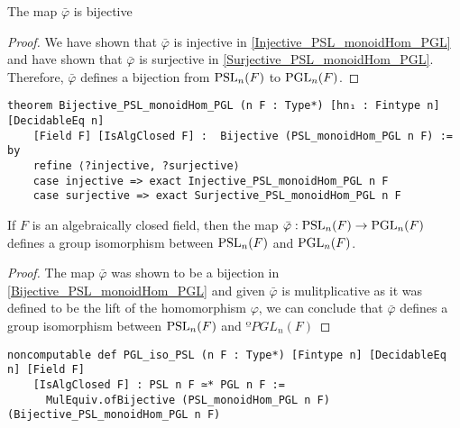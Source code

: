 \begin{lemma}
\label{Bijective_PSL_monoidHom_PGL}
\leanok
    The map $\bar{\varphi}$ is bijective
\end{lemma}
\begin{proof}
\leanok
 We have shown that $\bar{\varphi}$ is injective in \ref{Injective_PSL_monoidHom_PGL} and have shown that $\bar{\varphi}$ is surjective in \ref{Surjective_PSL_monoidHom_PGL}. 
 Therefore, $\bar{\varphi}$ defines a bijection from $\operatorname{PSL}_n(F)$ to $\operatorname{PGL}_n(F)$.
\end{proof}
\begin{footnotesize}
\begin{verbatim}
theorem Bijective_PSL_monoidHom_PGL (n F : Type*) [hn₁ : Fintype n] [DecidableEq n]
    [Field F] [IsAlgClosed F] :  Bijective (PSL_monoidHom_PGL n F) := by
    refine ⟨?injective, ?surjective⟩
    case injective => exact Injective_PSL_monoidHom_PGL n F
    case surjective => exact Surjective_PSL_monoidHom_PGL n F
\end{verbatim}
\end{footnotesize}

\begin{theorem}
\label{PGL_iso_PSL}
\leanok
    If $F$ is an algebraically closed field, then the map $\bar{\varphi} : \operatorname{PSL}_n(F) \rightarrow \operatorname{PGL}_n(F)$ defines a group isomorphism between $\operatorname{PSL}_n(F)$ and $\operatorname{PGL}_n(F)$.
\end{theorem}

\begin{proof}
\leanok
    The map $\bar{\varphi}$ was shown to be a bijection in \ref{Bijective_PSL_monoidHom_PGL} and given $\bar{\varphi}$ is mulitplicative as it was defined to be the lift of the homomorphism $\varphi$, we can conclude that 
    $\bar{\varphi}$ defines a group isomorphism between $\operatorname{PSL}_n(F)$ and $ºPGL_n(F)$
\end{proof}
\begin{footnotesize}
\begin{verbatim}
noncomputable def PGL_iso_PSL (n F : Type*) [Fintype n] [DecidableEq n] [Field F]
    [IsAlgClosed F] : PSL n F ≃* PGL n F :=
      MulEquiv.ofBijective (PSL_monoidHom_PGL n F) (Bijective_PSL_monoidHom_PGL n F)
\end{verbatim}
\end{footnotesize}

